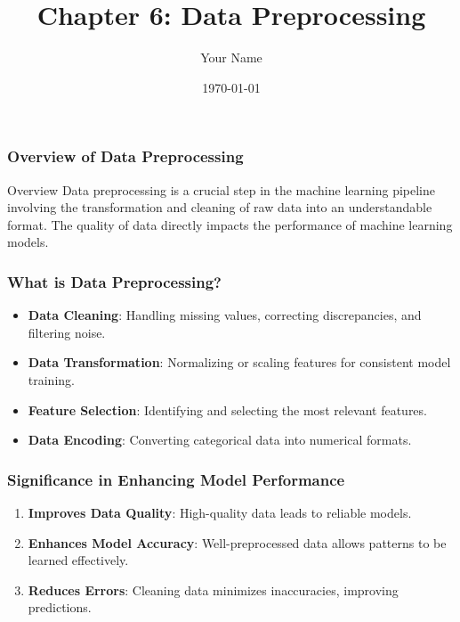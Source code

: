 \documentclass{beamer}
\title{Chapter 6: Data Preprocessing}
\author{Your Name}
\institute{Your Institution}
\date{\today}
\begin{document}
\frame{\titlepage}

\begin{frame}[fragile]
    \titlepage
\end{frame}

\begin{frame}[fragile]
    \frametitle{Overview of Data Preprocessing}
    \begin{block}{Overview}
        Data preprocessing is a crucial step in the machine learning pipeline involving the transformation and cleaning of raw data into an understandable format. The quality of data directly impacts the performance of machine learning models.
    \end{block}
\end{frame}

\begin{frame}[fragile]
    \frametitle{What is Data Preprocessing?}
    \begin{itemize}
        \item \textbf{Data Cleaning}: Handling missing values, correcting discrepancies, and filtering noise.
        \item \textbf{Data Transformation}: Normalizing or scaling features for consistent model training.
        \item \textbf{Feature Selection}: Identifying and selecting the most relevant features.
        \item \textbf{Data Encoding}: Converting categorical data into numerical formats.
    \end{itemize}
\end{frame}

\begin{frame}[fragile]
    \frametitle{Significance in Enhancing Model Performance}
    \begin{enumerate}
        \item \textbf{Improves Data Quality}: High-quality data leads to reliable models.
        \item \textbf{Enhances Model Accuracy}: Well-preprocessed data allows patterns to be learned effectively.
        \item \textbf{Reduces Errors}: Cleaning data minimizes inaccuracies, improving predictions.
    \end{enumerate}
\end{frame}
\end{document}
